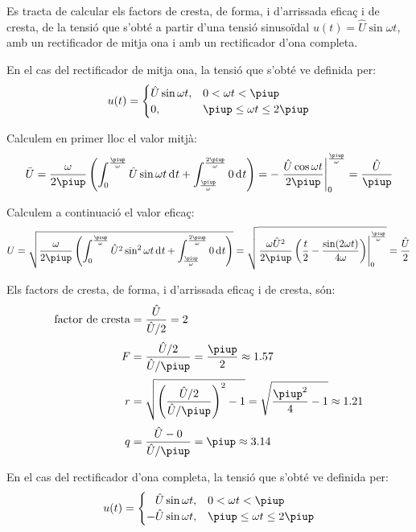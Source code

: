 \begin{exemple}
    Es tracta de calcular els factors de cresta, de forma, i d'arrissada eficaç i de cresta,
    de la tensió  que s'obté a partir d'una tensió sinusoïdal
    $u(t) = \hat{U} \sin\omega t$, amb un rectificador de mitja ona i
    amb un rectificador d'ona completa.

    En el cas del rectificador de mitja ona, la tensió que s'obté ve
    definida per:
    \[
    u(t) = \begin{cases} \hat{U} \sin\omega t, & 0 < \omega t < \piup\\
           0, & \piup \leq \omega t \leq 2\piup \end{cases}
    \]

    Calculem en primer lloc el valor mitjà:
    \[
    \bar{U} = \frac{\omega}{2\piup} \left( \int_0^\frac{\piup}{\omega}
    \hat{U} \sin\omega t \diff t +
    \int_\frac{\piup}{\omega}^\frac{2\piup}{\omega} 0 \diff t \right) = -
    \left. \frac{\hat{U} \cos\omega t}{2\piup}
    \right|_0^\frac{\piup}{\omega} = \frac{\hat{U}}{\piup}
    \]

    Calculem a continuació el valor eficaç:
    \[
    U = \sqrt{\frac{\omega}{2\piup} \left( \int_0^\frac{\piup}{\omega}
    \hat{U}^2 \sin^2\omega t \diff t +
    \int_\frac{\piup}{\omega}^\frac{2\piup}{\omega} 0 \diff t \right)} =
      \sqrt{\left.\frac{\omega \hat{U}^2}{2\piup}\left( \frac{t}{2} -
    \frac{\sin (2\omega t)}{4\omega}
    \right)\right|_0^\frac{\piup}{\omega}} = \frac{\hat{U}}{2}
    \]

    Els factors de cresta, de forma, i d'arrissada eficaç i de cresta, són:
    \begin{align*}
        \text{factor de cresta} &= \frac{\hat{U}}{\hat{U}/2} = 2 \\[0.5ex]
        F &= \frac{\hat{U}/2}{\hat{U}/\piup} =\frac{\piup}{2} \approx
        \num{1,57} \\[0.5ex]
        r &= \sqrt{\left(\frac{\hat{U}/2}{\hat{U}/\piup}\right)^2-1} =
    \sqrt{\frac{\piup^2}{4}-1} \approx \num{1,21} \\[0.5ex]
        q &= \frac{\hat{U} - 0}{\hat{U}/\piup} = \piup \approx \num{3,14}
    \end{align*}


    En el cas del rectificador d'ona completa, la tensió que s'obté ve
    definida per:
    \[
    u(t) = \begin{cases} \phantom{-}\hat{U} \sin\omega t, & 0 < \omega t < \piup\\
           -\hat{U} \sin\omega t, & \piup \leq \omega t \leq 2\piup \end{cases}
    \]


\end{exemple}

